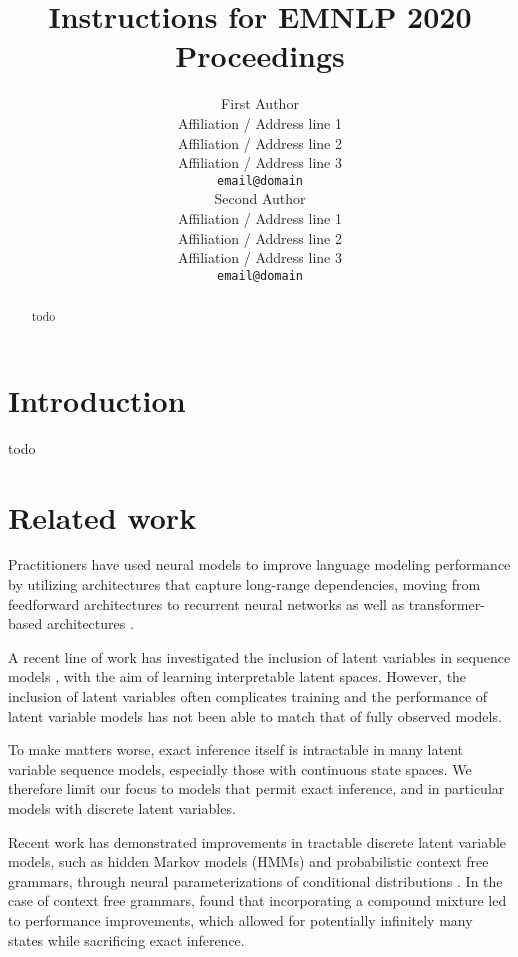\documentclass[11pt,a4paper]{article}
\title{Instructions for EMNLP 2020 Proceedings}
\author{First Author \\
  Affiliation / Address line 1 \\
  Affiliation / Address line 2 \\
  Affiliation / Address line 3 \\
  \texttt{email@domain} \\\And
  Second Author \\
  Affiliation / Address line 1 \\
  Affiliation / Address line 2 \\
  Affiliation / Address line 3 \\
  \texttt{email@domain} \\}
\date{}
\begin{document}
\maketitle
\begin{abstract}
todo
\end{abstract}

\section{Introduction}

todo

\section{Related work}
Practitioners have used neural models
to improve language modeling performance by utilizing
architectures that capture long-range dependencies,
moving from feedforward architectures \citep{bengio2003nlm}
to recurrent neural networks \citep{mikolov2010rnn,zaremba2014lstm,merity2017awdlstm}
as well as transformer-based architectures \citep{radford2019language}.

A recent line of work has investigated the inclusion of latent variables 
in sequence models \citep{bowman2015vae,kimg2019urnng},
with the aim of learning interpretable latent spaces.
However, the inclusion of latent variables often complicates training
and the performance of latent variable models has not been able to match
that of fully observed models.

To make matters worse,
exact inference itself is intractable in many latent variable sequence models,
especially those with continuous state spaces. 
We therefore limit our focus to models that permit exact inference,
and in particular models with discrete latent variables.

Recent work has demonstrated improvements in tractable discrete latent variable models,
such as hidden Markov models (HMMs) and probabilistic context free grammars,
through neural parameterizations of
conditional distributions \citep{tran2016hmm,kim2019cpcfg}.
In the case of context free grammars,
\citet{kim2019cpcfg} found that incorporating 
a compound mixture led to performance improvements,
which allowed for potentially infinitely many states
while sacrificing exact inference.
\end{document}
